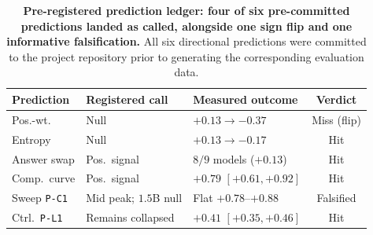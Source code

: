 \begin{table}[t]
\centering
\caption{\textbf{Pre-registered prediction ledger: four of six pre-committed predictions landed as called, alongside one sign flip and one informative falsification.} All six directional predictions were committed to the project repository prior to generating the corresponding evaluation data.}
\label{tab:ledger}
\scriptsize
\setlength{\tabcolsep}{1.6pt}
\begin{tabular}{@{}lllc@{}}
\toprule
Prediction & Registered call & Measured outcome & Verdict \\
\midrule
Pos.-wt.\ \tfa{} & Null & $+0.13 \to -0.37$ & Miss (flip) \\
Entropy \tfa{} & Null & $+0.13 \to -0.17$ & Hit \\
Answer swap & Pos.\ signal & $8/9$ models ($+0.13$) & Hit \\
Comp.\ curve & Pos.\ signal & $+0.79$ $[+0.61,+0.92]$ & Hit \\
Sweep \texttt{P-C1} & Mid peak; $1.5$B null & Flat $+0.78$--$+0.88$ & Falsified \\
Ctrl.\ \texttt{P-L1} & Remains collapsed & $+0.41$ $[+0.35,+0.46]$ & Hit \\
\bottomrule
\end{tabular}
\end{table}
